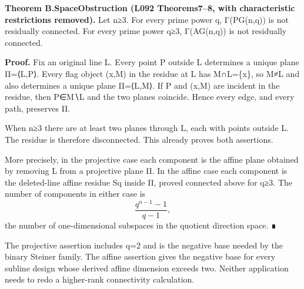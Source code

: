 \textbf{Theorem B.SpaceObstruction (L092 Theorems7--8, with
characteristic restrictions removed).} Let n≥3. For every prime power q,
Γ(PG(n,q)) is not residually connected. For every prime power q≥3,
Γ(AG(n,q)) is not residually connected.

\textbf{Proof.} Fix an original line L. Every point P outside L
determines a unique plane Π=⟨L,P⟩. Every flag object (x,M) in the
residue at L has M∩L=\{x\}, so M≠L and also determines a unique plane
Π=⟨L,M⟩. If P and (x,M) are incident in the residue, then P∈M∖L and the
two planes coincide. Hence every edge, and every path, preserves Π.

When n≥3 there are at least two planes through L, each with points
outside L. The residue is therefore disconnected. This already proves
both assertions.

More precisely, in the projective case each component is the affine
plane obtained by removing L from a projective plane Π. In the affine
case each component is the deleted-line affine residue Sq inside Π,
proved connected above for q≥3. The number of components in either case
is \[
\frac{q^{n-1}-1}{q-1},
\] the number of one-dimensional subspaces in the quotient direction
space. ∎

The projective assertion includes q=2 and is the negative base needed by
the binary Steiner family. The affine assertion gives the negative base
for every subline design whose derived affine dimension exceeds two.
Neither application needs to redo a higher-rank connectivity
calculation.
